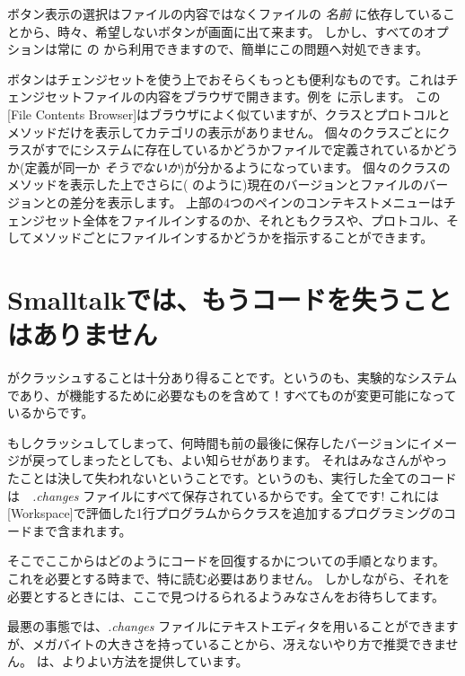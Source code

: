 \documentclass[a4paper,10pt,twoside]{book}
\begin{document}
ボタン表示の選択はファイルの内容ではなくファイルの \emph{名前} に依存していることから、時々、希望しないボタンが画面に出て来ます。
しかし、すべてのオプションは常に \actclick の  から利用できますので、簡単にこの問題へ対処できます。

 ボタンはチェンジセットを使う上でおそらくもっとも便利なものです。これはチェンジセットファイルの内容をブラウザで開きます。例を  に示します。
この[File Contents Browser]はブラウザによく似ていますが、クラスとプロトコルとメソッドだけを表示してカテゴリの表示がありません。
個々のクラスごとにクラスがすでにシステムに存在しているかどうかファイルで定義されているかどうか(定義が同一か \emph{そうでないか})が分かるようになっています。
個々のクラスのメソッドを表示した上でさらに(  のように)現在のバージョンとファイルのバージョンとの差分を表示します。
上部の4つのペインのコンテキストメニューはチェンジセット全体をファイルインするのか、それともクラスや、プロトコル、そしてメソッドごとにファイルインするかどうかを指示することができます。

\section{Smalltalkでは、もうコードを失うことはありません}

\pharo がクラッシュすることは十分あり得ることです。というのも、実験的なシステムであり、\pharo が機能するために必要なものを含めて！すべてものが変更可能になっているからです。


もしクラッシュしてしまって、何時間も前の最後に保存したバージョンにイメージが戻ってしまったとしても、よい知らせがあります。
それはみなさんがやったことは決して失われないということです。というのも、実行した全てのコードは　\emph{.changes} ファイルにすべて保存されているからです。全てです! 
これには[Workspace]で評価した1行プログラムからクラスを追加するプログラミングのコードまで含まれます。

そこでここからはどのようにコードを回復するかについての手順となります。
これを必要とする時まで、特に読む必要はありません。
しかしながら、それを必要とするときには、ここで見つけるられるようみなさんをお待ちしてます。

最悪の事態では、\emph{.changes} ファイルにテキストエディタを用いることができますが、メガバイトの大きさを持っていることから、冴えないやり方で推奨できません。
\pharo は、よりよい方法を提供しています。
\end{document}

